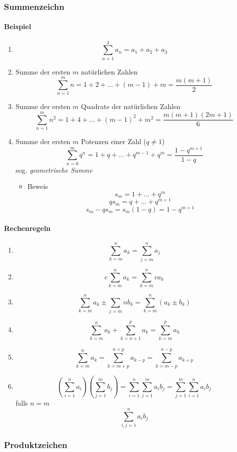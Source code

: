 \documentclass[a4paper]{scrartcl}
\begin{document}
\subsubsection{Summenzeichn}
\label{sec-2-1-1}
\paragraph{Beispiel}
\label{sec-2-1-1-1}
\begin{enumerate}
\item \[\sum_{n=1}^3a_n=a_1 + a_2 + a_3\]
\item Summe der ersten $m$ natürlichen Zahlen
\[\sum_{n=1}^{m}n = 1 + 2 + \ldots + \left(m -1\right) + m = \frac{m (m + 1)}{2}\]
\item Summe der ersten $m$ Quadrate der natürlichen Zahlen
\[\sum_{n=1}^m n^2 = 1 + 4 + \ldots + \left(m-1\right)^2 + m^2 = \frac{m(m+1)(2m+1)}{6}\]
\item Summe der ersten $m$ Potenzen einer Zahl ($q \neq 1$)
\[\sum_{n=0}^m q^n = 1+q+\dots+q^{m-1}+q^m = \frac{1 - q^{m + 1}}{1-q}\]
sog. \emph{geometrische Summe}
\begin{itemize}
\item Beweis
\[s_m = 1 + \ldots + q^m\]
\[q s_m = q + \ldots + q^{m+1}\]
\[s_m - q s_m = s_m\left(1-q\right) = 1-q^{m+1}\]
\end{itemize}
\end{enumerate}

\paragraph{Rechenregeln}
\label{sec-2-1-1-2}
\begin{enumerate}
\item \[\sum_{k=m}^n a_k = \sum_{j=m}^n a_j\]
\item \[c\sum_{k=m}^n a_k = \sum_{k=m}^n c a_k\]
\item \[\sum_{k=m}^n a_k \pm \sum_{j=m}{n} b_k = \sum_{k=m}^n \left(a_k \pm b_k\right)\]
\item \[\sum_{k=m}^n a_k + \sum_{k=n+1}^p a_k = \sum_{k=m}^{p} a_k\]
\item \[\sum_{k=m}^n a_k = \sum_{k=m+p}^{n+p} a_{k-p} = \sum_{k=m-p}^{n-p} a_{k+p}\]
\item \[\left(\sum_{i=1}^n a_i\right)(\sum_{j=1}^m b_j) = \sum_{i=1}^n \sum_{j=1}^m a_i b_j = \sum_{j=1}^m \sum_{i=1}^n a_i b_j\]
           falls $n=m$ \[\sum_{i,j=1}^n a_i b_j\]
\end{enumerate}

\subsubsection{Produktzeichen}
\label{sec-2-1-2}
\end{document}
